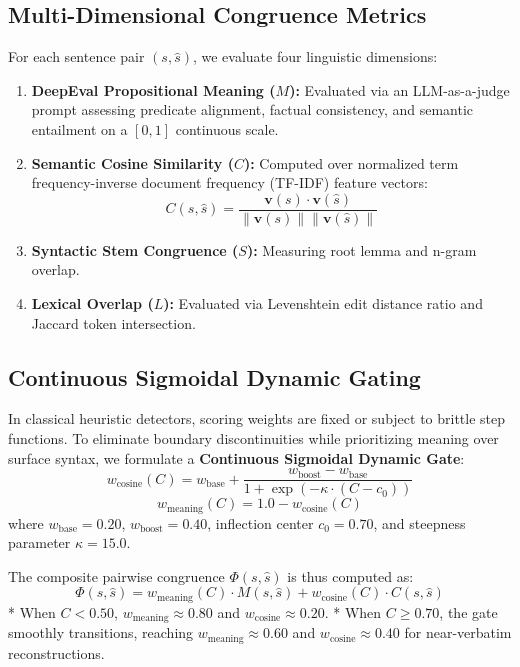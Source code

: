 \documentclass[conference]{IEEEtran}
\begin{document}
\subsection{Multi-Dimensional Congruence Metrics}
For each sentence pair $(s, \hat{s})$, we evaluate four linguistic dimensions:
\begin{enumerate}
    \item \textbf{DeepEval Propositional Meaning ($M$):} Evaluated via an LLM-as-a-judge prompt assessing predicate alignment, factual consistency, and semantic entailment on a $[0, 1]$ continuous scale.
    \item \textbf{Semantic Cosine Similarity ($C$):} Computed over normalized term frequency-inverse document frequency (TF-IDF) feature vectors:
    \begin{equation}
    C(s, \hat{s}) = \frac{\mathbf{v}(s) \cdot \mathbf{v}(\hat{s})}{\|\mathbf{v}(s)\| \|\mathbf{v}(\hat{s})\|}
    \end{equation}
    \item \textbf{Syntactic Stem Congruence ($S$):} Measuring root lemma and n-gram overlap.
    \item \textbf{Lexical Overlap ($L$):} Evaluated via Levenshtein edit distance ratio and Jaccard token intersection.
\end{enumerate}

\subsection{Continuous Sigmoidal Dynamic Gating}
In classical heuristic detectors, scoring weights are fixed or subject to brittle step functions. To eliminate boundary discontinuities while prioritizing meaning over surface syntax, we formulate a \textbf{Continuous Sigmoidal Dynamic Gate}:
\begin{equation}
w_{\text{cosine}}(C) = w_{\text{base}} + \frac{w_{\text{boost}} - w_{\text{base}}}{1 + \exp\left(-\kappa \cdot (C - c_0)\right)}
\end{equation}
\begin{equation}
w_{\text{meaning}}(C) = 1.0 - w_{\text{cosine}}(C)
\end{equation}
where $w_{\text{base}} = 0.20$, $w_{\text{boost}} = 0.40$, inflection center $c_0 = 0.70$, and steepness parameter $\kappa = 15.0$.

The composite pairwise congruence $\Phi(s, \hat{s})$ is thus computed as:
\begin{equation}
\Phi(s, \hat{s}) = w_{\text{meaning}}(C) \cdot M(s, \hat{s}) + w_{\text{cosine}}(C) \cdot C(s, \hat{s})
\end{equation}
* When $C < 0.50$, $w_{\text{meaning}} \approx 0.80$ and $w_{\text{cosine}} \approx 0.20$.
* When $C \ge 0.70$, the gate smoothly transitions, reaching $w_{\text{meaning}} \approx 0.60$ and $w_{\text{cosine}} \approx 0.40$ for near-verbatim reconstructions.
\end{document}
